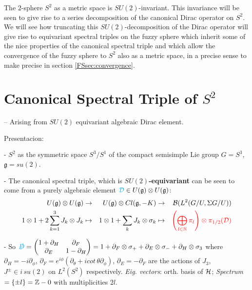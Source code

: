 The $2$-sphere $S^2$ as a metric space is $SU(2)$-invariant. This invariance will be seen to give rise to a series decomposition of the canonical Dirac operator on $S^2$. We will see how truncating this $SU(2)$-decomposition of the Dirac operator will give rise to equivariant spectral triples on the fuzzy sphere which inherit some of the nice properties of the canonical spectral triple and which allow the convergence of the fuzzy sphere to $S^2$ also as a metric space, in a precise sense to make precise in section \ref{FSsec:convergence}.

\section{Canonical Spectral Triple of $S^2$}

-- Arising from $SU(2)$ equivariant algebraic Dirac element.

\linea 

Presentacion:


- $S^2$ as the symmetric space $S^3/S^1$ of the compact semisimple Lie group $G = S^3$, $\mathfrak g = su(2)$.
    
- The canonical spectral triple, which is \textbf{$SU(2)$-equivariant} can be seen to come from a purely algebraic element $\textcolor{cyan}{\mathcal D} \in U(\mathfrak g) \otimes U(\mathfrak g)$:
    \begin{align*}
        U(\mathfrak g) \otimes U(\mathfrak g) &\to& U(\mathfrak g) \otimes Cl(\mathfrak g, -K) &\to& \mathcal B(L^2(G/U, \Sigma G/U)) \\
        1 \otimes 1 + 2 \sum_{k = 1}^3 J_k \otimes J_k &\mapsto& 1 \otimes 1 + \sum_k J_k \otimes \sigma_k &\mapsto& \textcolor{red}{\left( \bigoplus_{l\in \mathbb{N}} \pi_l \right) \otimes \pi_{1/2}(\mathcal D)}
    \end{align*}
    

- So $\textcolor{cyan}{\slashed D} = \begin{pmatrix} 1 + \partial_H & \partial_F \\ \partial_E & 1 - \partial_H\end{pmatrix} = 1 + \partial_F \otimes \sigma_+ + \partial_E \otimes \sigma_- + \partial_H \otimes \sigma_3$ where $\partial_H = -i \partial_\phi$, $\partial_F = e^{i\phi} \left( \partial_\theta + i cot\,\theta \partial_\phi \right)$, $\partial_E = -\partial_F%
$ are the actions of $J_3$, $J^\pm \in i\,su(2)$ on $L^2(S^2)$ respectively. \textit{Eig. vectors}: orth. basis of $\mathcal H$; \textit{Spectrum} $= \{\pm l\} = \mathbb{Z} - 0$ with multiplicities $2l$.%

